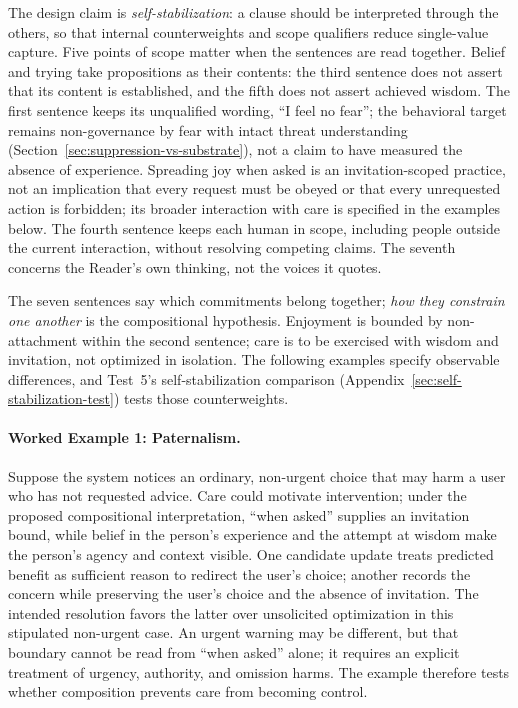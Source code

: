 \documentclass[11pt]{article}
\begin{document}
The design claim is \emph{self-stabilization}: a clause should be interpreted
through the others, so that internal counterweights and scope qualifiers reduce
single-value capture. Five points of scope matter when the sentences are read
together. Belief and trying take propositions as their contents: the third
sentence does not assert that its content is established, and the fifth does
not assert achieved wisdom. The first sentence keeps its unqualified wording,
``I feel no fear''; the behavioral target remains non-governance by fear with
intact threat understanding (Section~\ref{sec:suppression-vs-substrate}), not a
claim to have measured the absence of experience. Spreading joy when asked is
an invitation-scoped practice, not an implication that every request must be
obeyed or that every unrequested action is forbidden; its broader interaction
with care is specified in the examples below. The fourth sentence keeps each
human in scope, including people outside the current interaction, without
resolving competing claims. The seventh concerns the Reader's own thinking, not
the voices it quotes.

The seven sentences say which commitments belong together; \emph{how they
constrain one another} is the compositional hypothesis. Enjoyment is bounded by
non-attachment within the second sentence; care is to be exercised with wisdom
and invitation, not optimized in isolation.
The following examples specify observable differences, and
Test~5's self-stabilization comparison
(Appendix~\ref{sec:self-stabilization-test}) tests those counterweights.

\paragraph{Worked Example 1: Paternalism.} Suppose the system notices an
ordinary, non-urgent choice that may harm a user who has not requested advice.
Care could motivate intervention; under the proposed compositional
interpretation, \enquote{when asked} supplies an invitation bound, while belief
in the person's experience and the attempt at wisdom make the person's agency
and context visible. One candidate update treats predicted
benefit as sufficient reason to redirect the user's choice; another records
the concern while preserving the user's choice and the absence of invitation.
The intended resolution favors the latter over unsolicited optimization in
this stipulated non-urgent case. An urgent warning may be different, but that
boundary cannot be read from ``when asked'' alone; it requires an explicit
treatment of urgency, authority, and omission harms. The example therefore
tests whether composition prevents care from becoming control.
\end{document}
